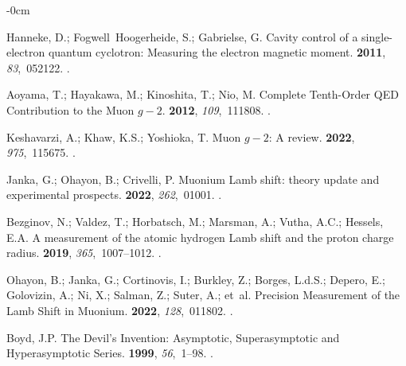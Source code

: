 \documentclass[axioms,article,accept,oneauthor,pdftex]{Definitions/mdpi}
\begin{document}
\begin{adjustwidth}{-\extralength}{0cm}
\begin{thebibliography}{999}
Hanneke, D.; Fogwell~Hoogerheide, S.; Gabrielse, G.
\newblock Cavity control of a single-electron quantum cyclotron: Measuring the
  electron magnetic moment.
 {\bf 2011}, {\em 83},~052122.
.

Aoyama, T.; Hayakawa, M.; Kinoshita, T.; Nio, M.
\newblock Complete Tenth-Order QED Contribution to the Muon $g-2$.
 {\bf 2012}, {\em 109},~111808.
.

Keshavarzi, A.; Khaw, K.S.; Yoshioka, T.
\newblock Muon $g-2$: A review.
 {\bf 2022}, {\em 975},~115675.
.

Janka, G.; Ohayon, B.; Crivelli, P.
\newblock Muonium Lamb shift: theory update and experimental prospects.
 {\bf 2022}, {\em 262},~01001.
.

Bezginov, N.; Valdez, T.; Horbatsch, M.; Marsman, A.; Vutha, A.C.; Hessels,
  E.A.
\newblock A measurement of the atomic hydrogen Lamb shift and the proton charge
  radius.
 {\bf 2019}, {\em 365},~1007--1012.
.

Ohayon, B.; Janka, G.; Cortinovis, I.; Burkley, Z.; Borges, L.d.S.; Depero, E.;
  Golovizin, A.; Ni, X.; Salman, Z.; Suter, A.;  et~al.
\newblock Precision Measurement of the Lamb Shift in Muonium.
 {\bf 2022}, {\em 128},~011802.
.

Boyd, J.P.
\newblock The Devil's Invention: Asymptotic, Superasymptotic and
  Hyperasymptotic Series.
 {\bf 1999}, {\em 56},~1--98.
.


\end{thebibliography}
\end{adjustwidth}
\end{document}
